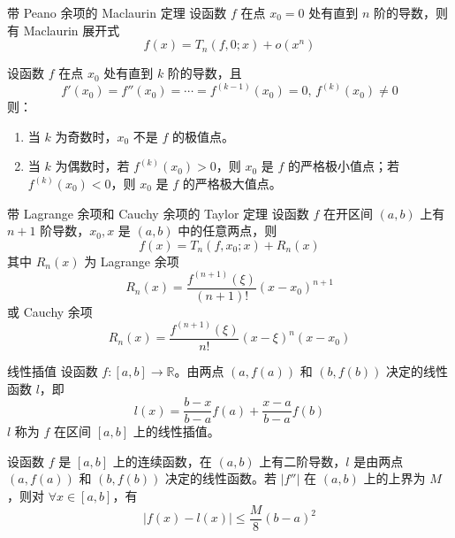 \begin{theorem}{带 Peano 余项的 Maclaurin 定理}
  设函数 $f$ 在点 $x_0 = 0$ 处有直到 $n$ 阶的导数，则有 Maclaurin 展开式
  \[f(x) = T_n(f,0;x) + o(x^n)\]
\end{theorem}

\begin{theorem}
  设函数 $f$ 在点 $x_0$ 处有直到 $k$ 阶的导数，且
  \[f'(x_0) = f''(x_0) = \cdots = f^{(k - 1)}(x_0) = 0,\, f^{(k)}(x_0) \ne 0\]
  则：
  \begin{enumerate}
    \item 当 $k$ 为奇数时，$x_0$ 不是 $f$ 的极值点。
    \item 当 $k$ 为偶数时，若 $f^{(k)}(x_0) > 0$，则 $x_0$ 是 $f$ 的严格极小值点；若 $f^{(k)}(x_0) < 0$，则 $x_0$ 是 $f$ 的严格极大值点。
  \end{enumerate}
\end{theorem}

\begin{theorem}{带 Lagrange 余项和 Cauchy 余项的 Taylor 定理}
  设函数 $f$ 在开区间 $(a,b)$ 上有 $n + 1$ 阶导数，$x_0,x$ 是 $(a,b)$ 中的任意两点，则
  \[f(x) = T_n(f,x_0;x) + R_n(x)\]
  其中 $R_n(x)$ 为 Lagrange 余项
  \[R_n(x) = \frac{f^{(n + 1)}(\xi)}{(n + 1)!}(x - x_0)^{n + 1}\]
  或 Cauchy 余项
  \[R_n(x) = \frac{f^{(n + 1)}(\xi)}{n!}(x - \xi)^n(x - x_0)\]
\end{theorem}

\begin{definition}{线性插值}
  设函数 $f:[a,b] \to \mathbb{R}$。由两点 $(a,f(a))$ 和 $(b,f(b))$ 决定的线性函数 $l$，即
  \[l(x) = \frac{b - x}{b -a}f(a) + \frac{x - a}{b - a}f(b)\]
  $l$ 称为 $f$ 在区间 $[a,b]$ 上的线性插值。
\end{definition}

\begin{theorem}
  设函数 $f$ 是 $[a,b]$ 上的连续函数，在 $(a,b)$ 上有二阶导数，$l$ 是由两点 $(a,f(a))$ 和 $(b,f(b))$ 决定的线性函数。若 $|f''|$ 在 $(a,b)$ 上的上界为 $M$，则对 $\forall x \in [a,b]$，有
  \[|f(x) - l(x)| \leqslant \frac{M}{8}(b - a)^2\]
\end{theorem}

